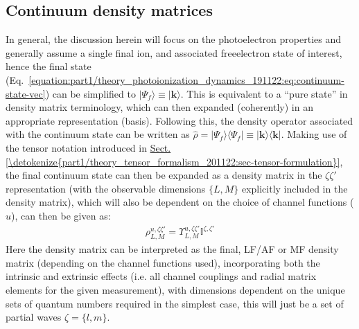 \documentclass[letterpaper,table,10pt,english]{jupyterBook}
\begin{document}
\subsection{Continuum density matrices}
\label{\detokenize{part1/theory_density_matrices_310123:continuum-density-matrices}}\label{\detokenize{part1/theory_density_matrices_310123:id5}}
\sphinxAtStartPar
In general, the discussion herein will focus on the photoelectron properties and generally assume a single final ion, and associated free\sphinxhyphen{}electron state of interest, hence the final state (Eq. \eqref{equation:part1/theory_photoionization_dynamics_191122:eq:continuum-state-vec}) can be simplified to \(|\Psi_f\rangle\equiv|\mathbf{k}\rangle\). This is equivalent to a “pure state” in density matrix terminology, which can then expanded (coherently) in an appropriate representation (basis). Following this, the density operator associated with the continuum state can be written as \(\hat{\rho}=|\Psi_f\rangle\langle\Psi_f|\equiv|\mathbf{k}\rangle\langle\mathbf{k}|\). Making use of the tensor notation introduced in \hyperref[\detokenize{part1/theory_tensor_formalism_201122:sec-tensor-formulation}]{Sect.\@ \ref{\detokenize{part1/theory_tensor_formalism_201122:sec-tensor-formulation}}}, the final continuum state can then be expanded as a density matrix in the \(\zeta\zeta'\) representation (with the observable dimensions \(\{L,M\}\) explicitly included in the density matrix), which will also be dependent on the choice of channel functions (\(u\)), can then be given as:
\begin{equation}\label{equation:part1/theory_density_matrices_310123:eqn:full-density-mat}
\begin{split}
{\rho}_{L,M}^{u,\zeta\zeta'}=\varUpsilon_{L,M}^{u,\zeta\zeta'}\mathbb{I}^{\zeta,\zeta'}
\end{split}
\end{equation}
\sphinxAtStartPar
Here the density matrix can be interpreted as the final, LF/AF or MF density matrix (depending on the channel functions used), incorporating both the intrinsic and extrinsic effects (i.e. all channel couplings and radial matrix elements for the given measurement), with dimensions dependent on the unique sets of quantum numbers required \sphinxhyphen{} in the simplest case, this will just be a set of partial waves \(\zeta = \{l,m\}\).
\end{document}
